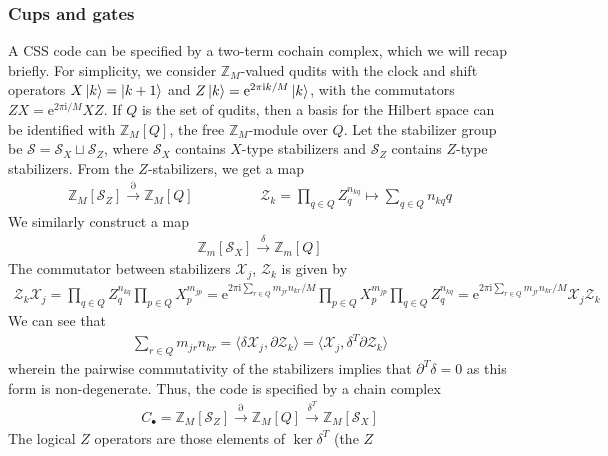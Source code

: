 \documentclass{article}
\theoremstyle{definition}
\theoremstyle{definition}
\newcommand{\Z}{\mathbb Z}
\newcommand{\e}{\mathrm{e}}
\newcommand{\ii}{\mathrm{i}}
\begin{document}
\subsubsection{Cups and gates}
A CSS code can be specified by a two-term cochain complex, which we will recap briefly. For
simplicity, we consider $\Z_M$-valued qudits with the clock and shift operators
$X\ket{k} = \ket{k+1}$ and $Z\ket{k} = \e^{2\pi \ii k / M}\ket{k}$, with the
commutators $ZX = \e^{2\pi \ii /M}XZ$.
If $Q$ is the set of qudits, then a basis for the Hilbert space can be
identified with $\Z_M[Q]$, the free $\Z_M$-module over $Q$. 
Let the stabilizer group be $\mathcal S = \mathcal S_X \sqcup
\mathcal S_Z$, where $\mathcal S_X$ contains $X$-type stabilizers and $\mathcal
S_Z$ contains $Z$-type stabilizers. From the $Z$-stabilizers, we get a map
\begin{align}\label{eq:CSS-chain-complex-boundary-map}
  \Z_M[\mathcal S_Z] \xrightarrow{\partial} \Z_M[Q] \hspace{2cm}  \mathcal Z_k = \prod_{q \in Q}Z_{q}^{n_{kq}} \mapsto \sum_{q \in Q}n_{kq}q
\end{align}
We similarly construct a map
\begin{align}
  \Z_m[\mathcal S_X] \xrightarrow{\delta} \Z_m[Q]
\end{align}
The commutator between stabilizers $\mathcal X_j$, $\mathcal Z_k$ is given by
\begin{align}\label{eq:CSS-chain-complex-stabilizer-commutators}
 \mathcal Z_k \mathcal X_j = \prod_{q \in Q}Z_q^{n_{kq}} \prod_{p \in Q}X_{p}^{m_{jp}} = 
 \e^{2\pi \ii\sum_{r \in Q}m_{jr}n_{kr}/M}\prod_{p \in Q}X_{p}^{m_{jp}}\prod_{q \in Q}Z_q^{n_{kq}} = \e^{2\pi \ii\sum_{r \in Q}m_{jr}n_{kr}/M}\mathcal X_j \mathcal Z_k
\end{align}
We can see that
\begin{align}\label{eq:CSS-code-chain-complex-correspondence}
   \sum_{r \in Q}m_{jr}n_{kr} = \langle  \delta \mathcal X_j,  \partial \mathcal Z_k\rangle = \langle\mathcal X_j, \delta^T \partial\mathcal Z_k \rangle
\end{align}
wherein the pairwise commutativity of the stabilizers implies that $\partial^T
\delta = 0$ as this form is non-degenerate. Thus, the code is specified by a
chain complex
\begin{align}
C_\bullet = \Z_M[\mathcal S_Z] \xrightarrow{\partial} \Z_M[Q] \xrightarrow{\delta^T} \Z_M[\mathcal S_X]
\end{align}
The logical $Z$ operators are those elements of $\ker \delta^T$ (the $Z$
\end{document}
